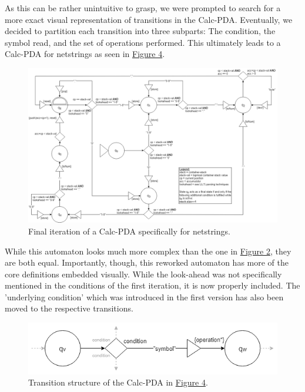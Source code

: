 As this can be rather unintuitive to grasp, we were prompted to search for a more exact visual representation of transitions in the Calc-PDA. Eventually, we decided to partition each transition into three subparts: The condition, the symbol read, and the set of operations performed. This ultimately leads to a Calc-PDA for netstrings as seen in \hyperref[fig:fig-4-netstring-Calc-pda-2]{Figure 4}.
\begin{figure}
    \centering
    \includegraphics[width=\linewidth]{fig/Calc-PDA-netstrings-version_10.png}
    \caption{Final iteration of a Calc-PDA specifically for netstrings.}
    \label{fig:fig-4-netstring-Calc-pda-2}
\end{figure}
While this automaton looks much more complex than the one in \hyperref[fig:fig-2-netstring-Calc-pda-1]{Figure 2}, they are both equal. Importantly, though, this reworked automaton has more of the core definitions embedded visually. While the look-ahead was not specifically mentioned in the conditions of the first iteration, it is now properly included. The 'underlying condition' which was introduced in the first version has also been moved to the respective transitions.
\begin{figure}
    \centering
    \includegraphics[width=0.8\linewidth]{fig/transitions-netstring-version_10.png}
    \caption{Transition structure of the Calc-PDA in \hyperref[fig:fig-4-netstring-Calc-pda-2]{Figure 4}.}
    \label{fig:fig-5-transition-netstring-Calc-pda-2}
\end{figure}\\\\
